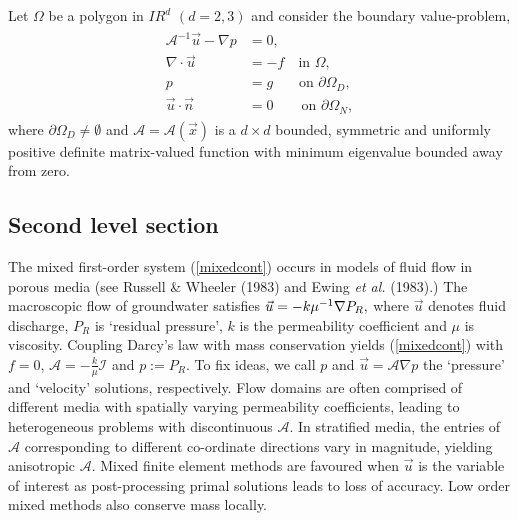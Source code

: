 \documentclass{imamci}
\numberwithin{equation}{section}
\begin{document}
Let $\Omega$ be a polygon in $I\!\!R^{d} $ $(d=2,3)$ and consider the boundary value-problem,
\begin{align}\label{mixedcont}
\begin{split}
\mathcal{A}^{-1}\vec{u}-\nabla p &=  0,\\
\nabla \cdot \vec {u} &= -f \quad  \mbox{in } \Omega,\\
p &= g
\quad\ \ \ \, \mbox{on } \partial\Omega_{D},\\
\vec {u}\cdot\vec {n} &= 0
\quad\quad \mbox{on } \partial\Omega_{N},
\end{split}
\end{align}
where $\partial\Omega_{D}\neq \emptyset$ and $\mathcal{A} = \mathcal{A}(\vec{x})$
is a $d \times d$ bounded, symmetric and uniformly positive definite matrix-valued
function with minimum eigenvalue bounded away from zero. 

\subsection{Second level section}

The mixed first-order system (\ref{mixedcont}) occurs in models of fluid
flow in porous media (see Russell \& Wheeler (1983) and Ewing {\it et al.}
(1983).) The macroscopic flow of groundwater satisfies $\vec{u} =   -k\mu^{-1} \nabla\break
P_{R},$ where $\vec{u}$ denotes fluid discharge, $P_{R}$ is `residual pressure',
$k$ is the permeability coefficient and $\mu$ is viscosity. Coupling Darcy's
law with mass conservation yields (\ref{mixedcont}) with $f=0$, $\mathcal{A}
= -\frac{k}{\mu}\mathcal{I}$ and $p:=P_{R}$. To fix ideas, we call $p$ and
$\vec{u}= \mathcal{A} \nabla p$ the `pressure' and `velocity' solutions,
respectively.  Flow domains are often comprised of different media with spatially
varying permeability coefficients, leading to heterogeneous problems with
discontinuous $\mathcal{A}.$ In stratified media, the entries of $\mathcal{A}$
corresponding to different co-ordinate directions vary in magnitude, yielding
anisotropic $\mathcal{A}.$ Mixed finite element methods are favoured when
$\vec{u}$ is the variable of interest as post-processing primal solutions
leads to loss of accuracy. Low order mixed methods also conserve mass locally.
\end{document}
